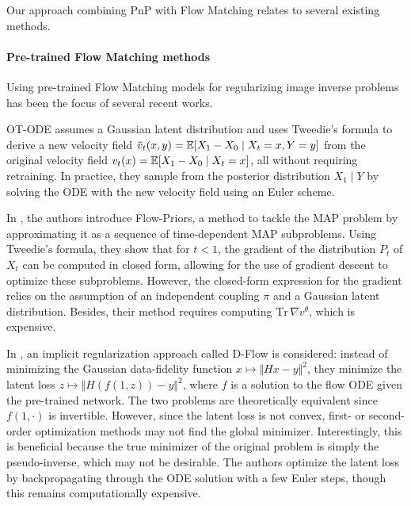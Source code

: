 \documentclass{article} %
\theoremstyle{definition}
\begin{document}
Our approach combining PnP with Flow Matching relates to several existing methods.

\paragraph{Pre-trained Flow Matching methods} Using pre-trained Flow Matching models for regularizing image inverse problems has been the focus of several recent works.

OT-ODE \citep{pokle2024trainingfree} assumes a Gaussian latent distribution and uses Tweedie's formula to derive a new velocity field $\tilde{v}_t(x, y) = \mathbb{E}[X_1 - X_0 \mid X_t = x, Y = y]$ from the original velocity field $v_t(x) = \mathbb{E}[X_1 - X_0 \mid X_t = x]$, all without requiring retraining. In practice, they sample from the posterior distribution $X_1 \mid Y$ by solving the ODE with the new velocity field using an Euler scheme.

In \citet{zhang2024flow}, the authors introduce Flow-Priors, a method to tackle the MAP problem by approximating it as a sequence of time-dependent MAP subproblems. Using Tweedie's formula, they show that for $t < 1$, the gradient of the distribution $P_t$ of $X_t$ can be computed in closed form, allowing for the use of gradient descent to optimize these subproblems. However, the closed-form expression for the gradient relies on the assumption of an independent coupling $\pi$ and a Gaussian latent distribution. Besides, their method requires computing $\mathrm{Tr}\,\nabla v^\theta$, which is expensive.

In \citet{ben2024dflow}, an implicit regularization approach called D-Flow is considered: instead of minimizing the Gaussian data-fidelity function $x \mapsto \Vert Hx - y \Vert^2$, they minimize the latent loss $z \mapsto \Vert H(f(1,z)) - y \Vert^2$, where $f$ is a solution to the flow ODE given the pre-trained network. The two problems are theoretically equivalent since $f(1, \cdot)$ is invertible.
However, since the latent loss is not convex, first- or second-order optimization methods may not find the global minimizer. Interestingly, this is beneficial because the true minimizer of the original problem is simply the pseudo-inverse, which may not be desirable. The authors optimize the latent loss by backpropagating through the ODE solution with a few Euler steps, though this remains computationally expensive.
\end{document}
